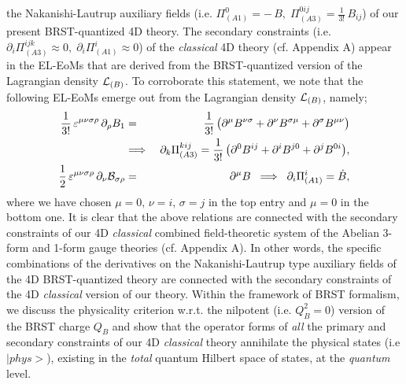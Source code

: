 \documentclass[12pt]{article}
\begin{document}
the Nakanishi-Lautrup auxiliary fields (i.e. $\Pi^{0}_{(A1)}  = -\, B,\; \Pi^{0ij}_{(A3)}  = \frac {1}{3!}\, B_{ij}$) of our present BRST-quantized 4D theory.
The secondary constraints (i.e. $\partial_i \Pi ^{ijk}_{(A3)} \approx 0,\; \partial_i \Pi ^{i}_{(A1)} \approx 0$) of the {\it classical} 4D theory
(cf. Appendix A) appear in the EL-EoMs that are derived from the BRST-quantized version of the Lagrangian density ${\cal L}_{(B)}$. To corroborate this statement,
we note that the following EL-EoMs emerge out from the Lagrangian density ${\cal L}_{(B)}$, namely;
\begin{eqnarray}\label{44}
 \dfrac{1}{3!}\, \varepsilon^{\mu\nu\sigma\rho}\,\partial_\rho B_1 &=&  \dfrac{1}{3!}\, \big (\partial^\mu B^{\nu\sigma} + \partial^\nu B^{\sigma\mu} 
 + \partial^\sigma B^{\mu\nu} \big ) \nonumber\\
&\Longrightarrow& \;\partial_k \Pi^{kij}_{(A3)} = \dfrac{1}{3!}\, 
\big (\partial^0 B^{ij} + \partial^i B^{j0}  + \partial^j B^{0i} \big ), \nonumber\\
\dfrac{1}{2}\, \varepsilon^{\mu\nu\sigma\rho}\,\partial_\nu {\cal B}_{\sigma\rho} &=& \partial^\mu B \;\;\Longrightarrow \;\; \partial_i \Pi^i_{(A1)} = \dot B,
\end{eqnarray}
where we have chosen $\mu = 0, \, \nu = i, \, \sigma = j$ in the top entry and $\mu = 0$ in the bottom one.
It is clear that the above relations are connected with the secondary constraints of our 4D {\it classical} 
combined field-theoretic system of the Abelian 3-form and 1-form gauge theories (cf. Appendix A). In other words, the specific combinations of the
derivatives on the Nakanishi-Lautrup type auxiliary fields of the 4D BRST-quantized theory are connected with the secondary constraints 
of the 4D {\it classical} version of our theory. Within the framework of BRST formalism, we discuss the physicality criterion w.r.t. the nilpotent
(i.e. $Q_B^2 = 0$) version of the BRST charge $Q_B$ and show that the operator forms of {\it all} the primary and secondary constraints  of 
our 4D {\it classical} theory annihilate the physical states (i.e $|phys>$), existing in the {\it total} quantum Hilbert space of states, at the {\it quantum} level. 
\end{document}
